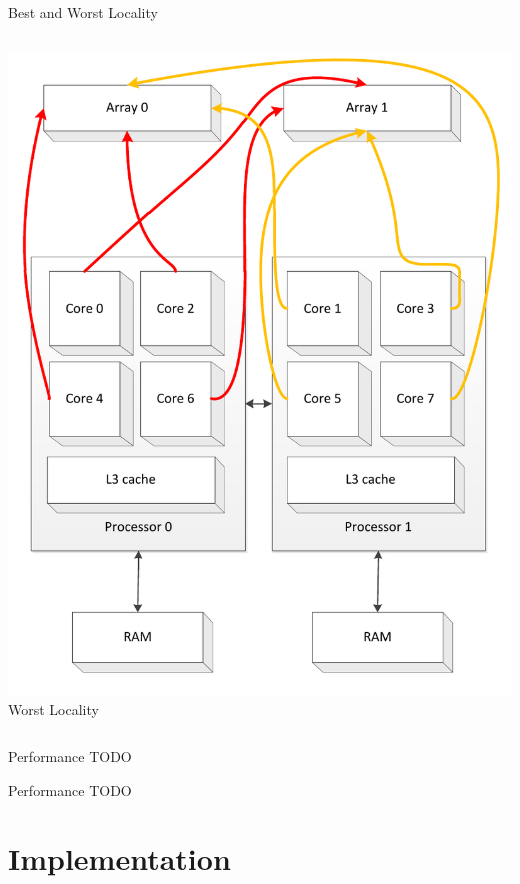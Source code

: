 \begin{frame}{Best and Worst Locality}
\begin{columns}[c]
\begin{column}{0.50\textwidth}
\begin{center}
        \includegraphics[width=\textwidth]{figures/cache-stress-test-mafushi-worst} \\
        \tiny{Worst Locality}
      \end{center}
    \end{column}
  \end{columns}
\end{frame}

\note{
}

\begin{frame}{Performance}
  TODO
\end{frame}

\note{
}

\begin{frame}{Performance}
  TODO
\end{frame}

\note{
}


\section{Implementation}

